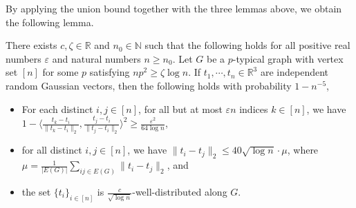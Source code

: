 By applying the union bound together with the three lemmas above,
we obtain the following lemma.

\begin{lemma} \label{lem:gaussian_wd}
There exists $c, \zeta \in \mathbb{R}$ and $n_0 \in \mathbb{N}$ such
that the following holds for all positive real numbers $\varepsilon$ and natural numbers $n \ge n_0$.
Let $G$ be a $p$-typical graph with vertex set $[n]$ for some $p$ satisfying 
$np^2 \geq \zeta \log n$. If $t_{1},\cdots,t_{n}\in\mathbb{R}^{3}$
are independent random Gaussian vectors, then the following holds
with probability $1-n^{-5}$,
\begin{itemize}
  \setlength{\itemsep}{1pt} \setlength{\parskip}{0pt}
  \setlength{\parsep}{0pt}
\item[1.] For each distinct $i,j \in [n]$, for all but at most $\varepsilon n$ indices $k \in [n]$, we have $1 - \langle \frac{t_k - t_i}{\|t_k - t_i \|_2}, \frac{t_j - t_i}{\|t_j - t_i\|_2} \rangle^2 \ge \frac{\varepsilon^2}{64 \log n}$,
\item[2.] for all distinct $i,j \in [n]$, we have $\|t_i - t_j\|_2 \le 40\sqrt{\log n} \cdot \mu$, where $\mu = \frac{1}{|E(G)|} \sum_{ij \in E(G)} \|t_i - t_j\|_2$, and
\item[3.] the set $\{t_i\}_{i\in[n]}$ is $\frac{c}{\sqrt{\log n}}$-well-distributed along $G$.
\end{itemize}\end{lemma}
